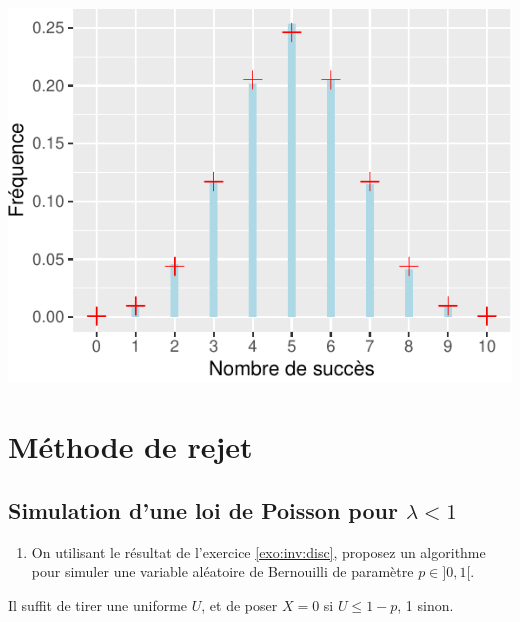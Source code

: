 \documentclass[]{article}
\providecommand{\tightlist}{%
  \setlength{\itemsep}{0pt}\setlength{\parskip}{0pt}}
\newenvironment{Correction}%
  { \vspace{\baselineskip}\begin{mdframed}[backgroundcolor=my_green]}%
  {\end{mdframed}}
\begin{document}
\begin{center}\includegraphics{correction_simulation_variables_aleatoires_files/figure-latex/plot_frequences_empiriques-1} \end{center}

\hypertarget{muxe9thode-de-rejet}{%
\section{Méthode de rejet}\label{muxe9thode-de-rejet}}

\hypertarget{simulation-dune-loi-de-poisson-pour-lambda-1}{%
\subsection{\texorpdfstring{Simulation d'une loi de Poisson pour
\(\lambda < 1\)}{Simulation d'une loi de Poisson pour \textbackslash{}lambda \textless{} 1}}\label{simulation-dune-loi-de-poisson-pour-lambda-1}}

\begin{enumerate}
\def\labelenumi{\arabic{enumi}.}
\tightlist
\item
  On utilisant le résultat de l'exercice \ref{exo:inv:disc}, proposez un
  algorithme pour simuler une variable aléatoire de Bernouilli de
  paramètre \(p \in ]0, 1[\).
\end{enumerate}

\begin{Correction}

Il suffit de tirer une uniforme $U$, et de poser $X = 0$ si $U \leq 1 - p$, 1 sinon.

\end{Correction}
\end{document}
